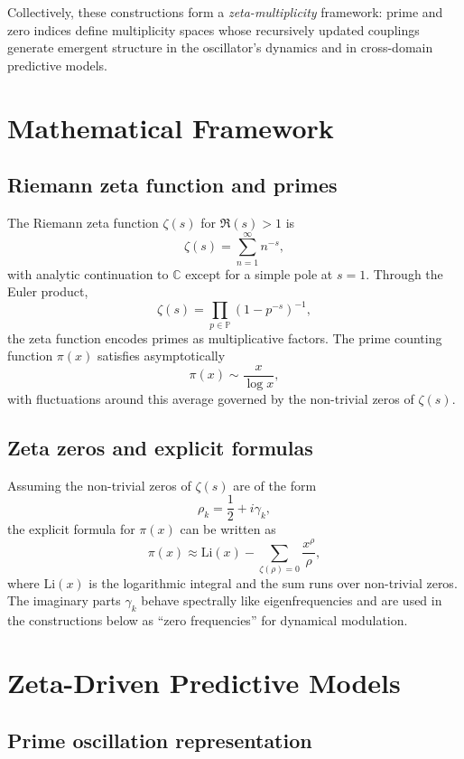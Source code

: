 \documentclass[11pt]{article}
\begin{document}
Collectively, these constructions form a \emph{zeta-multiplicity} framework: prime and zero indices define multiplicity spaces whose recursively updated couplings generate emergent structure in the oscillator's dynamics and in cross-domain predictive models.

\section{Mathematical Framework}

\subsection{Riemann zeta function and primes}

The Riemann zeta function $\zeta(s)$ for $\Re(s) > 1$ is
\[
\zeta(s) = \sum_{n=1}^{\infty} n^{-s},
\]
with analytic continuation to $\mathbb{C}$ except for a simple pole at $s=1$.\cite{file1,file2} Through the Euler product,
\[
\zeta(s) = \prod_{p \in \mathbb{P}} \left(1 - p^{-s}\right)^{-1},
\]
the zeta function encodes primes as multiplicative factors.\cite{file1} The prime counting function $\pi(x)$ satisfies asymptotically
\[
\pi(x) \sim \frac{x}{\log x},
\]
with fluctuations around this average governed by the non-trivial zeros of $\zeta(s)$.\cite{file1}

\subsection{Zeta zeros and explicit formulas}

Assuming the non-trivial zeros of $\zeta(s)$ are of the form
\[
\rho_k = \frac{1}{2} + i \gamma_k,
\]
the explicit formula for $\pi(x)$ can be written as\cite{file2}
\[
\pi(x) \approx \mathrm{Li}(x) - \sum_{\zeta(\rho)=0} \frac{x^{\rho}}{\rho},
\]
where $\mathrm{Li}(x)$ is the logarithmic integral and the sum runs over non-trivial zeros.\cite{file2} The imaginary parts $\gamma_k$ behave spectrally like eigenfrequencies and are used in the constructions below as “zero frequencies” for dynamical modulation.

\section{Zeta-Driven Predictive Models}

\subsection{Prime oscillation representation}
\end{document}
